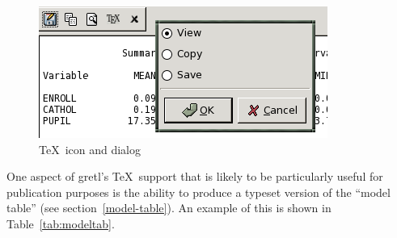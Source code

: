 \begin{figure}[htbp]
  \caption{\TeX\ icon and dialog}
  \label{fig:tex-icon}
    \begin{center}
      \includegraphics[scale=0.75]{figures/texdialog} 
    \end{center}
\end{figure}

One aspect of gretl's \TeX\ support that is likely to be
particularly useful for publication purposes is the ability to produce
a typeset version of the ``model table'' (see
section~\ref{model-table}).  An example of this is shown in
Table~\ref{tab:modeltab}.

